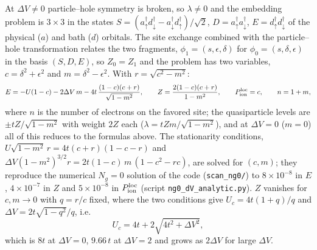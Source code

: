 \documentclass[11pt]{article}
\newcommand{\Ng}{N_{g}}
\newcommand{\dV}{\Delta V}
\begin{document}
At $\dV\neq0$ particle--hole symmetry is broken, so $\lambda\neq0$ and the embedding problem is $3\times3$ in the states $S=(a^\dagger_\uparrow d^\dagger_\downarrow-a^\dagger_\downarrow d^\dagger_\uparrow)/\sqrt2$, $D=a^\dagger_\uparrow a^\dagger_\downarrow$, $E=d^\dagger_\uparrow d^\dagger_\downarrow$ of the physical ($a$) and bath ($d$) orbitals.
The site exchange combined with the particle--hole transformation relates the two fragments, $\phi_1=(s,\epsilon,\delta)$ for $\phi_0=(s,\delta,\epsilon)$ in the basis $(S,D,E)$, so $Z_0=Z_1$ and the problem has two variables, $c=\delta^2+\epsilon^2$ and $m=\delta^2-\epsilon^2$. With $r=\sqrt{c^2-m^2}$:
\begin{equation}
  E=-U(1-c)-2\dV\,m-4t\,\frac{(1-c)(c+r)}{\sqrt{1-m^2}},\qquad
  Z=\frac{2(1-c)(c+r)}{1-m^2},\qquad P_{\rm ion}^{\rm loc}=c,\qquad n=1+m,
\end{equation}
where $n$ is the number of electrons on the favored site; the quasiparticle levels are $\pm tZ/\sqrt{1-m^2}$ with weight $2Z$ each ($\lambda=tZm/\sqrt{1-m^2}$), and at $\dV=0$ ($m=0$) all of this reduces to the formulas above.
The stationarity conditions, $U\sqrt{1-m^2}\,r=4t(c+r)(1-c-r)$ and $\dV(1-m^2)^{3/2}r=2t(1-c)\,m\,(1-c^2-rc)$, are solved for $(c,m)$; they reproduce the numerical $\Ng=0$ solution of the code (\texttt{scan\_ng0/}) to $8\times10^{-8}$ in $E$, $4\times10^{-7}$ in $Z$ and $5\times10^{-8}$ in $P_{\rm ion}^{\rm loc}$ (script \texttt{ng0\_dV\_analytic.py}).
$Z$ vanishes for $c,m\to0$ with $q=r/c$ fixed, where the two conditions give $U_c=4t(1+q)/q$ and $\dV=2t\sqrt{1-q^2}/q$, i.e.
\begin{equation}
  U_c=4t+2\sqrt{4t^2+\dV^2},
\end{equation}
which is $8t$ at $\dV=0$, $9.66\,t$ at $\dV=2$ and grows as $2\dV$ for large $\dV$.
\end{document}
